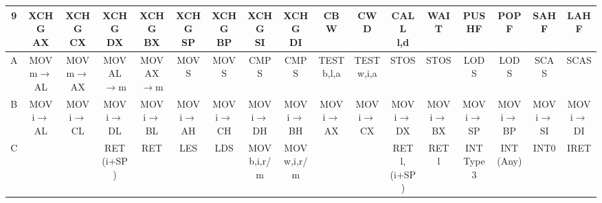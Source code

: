 {\begin{longtable}{|c|c|c|c|c|c|c|c|c|c|c|c|c|c|c|c|c|}
\hline
9 & \makecell{XCHG\\AX} & \makecell{XCHG\\CX} & \makecell{XCHG\\DX} & \makecell{XCHG\\BX} & \makecell{XCHG\\SP} & \makecell{XCHG\\BP} & \makecell{XCHG\\SI} & \makecell{XCHG\\DI} & CBW & CWD & \makecell{CALL\\l,d} & WAIT & PUSHF & POPF & SAHF & LAHF \\
\hline
A & \makecell{MOV\\m$\rightarrow$AL} & \makecell{MOV\\m$\rightarrow$AX} & \makecell{MOV\\AL$\rightarrow$m} & \makecell{MOV\\AX$\rightarrow$m} & MOVS & MOVS & CMPS & CMPS & \makecell{TEST\\b,l,a} & \makecell{TEST\\w,i,a} & STOS & STOS & LODS & LODS & SCAS & SCAS \\
\hline
B & \makecell{MOV\\i$\rightarrow$AL} & \makecell{MOV\\i$\rightarrow$CL} & \makecell{MOV\\i$\rightarrow$DL} & \makecell{MOV\\i$\rightarrow$BL} & \makecell{MOV\\i$\rightarrow$AH} & \makecell{MOV\\i$\rightarrow$CH} & \makecell{MOV\\i$\rightarrow$DH} & \makecell{MOV\\i$\rightarrow$BH} & \makecell{MOV\\i$\rightarrow$AX} & \makecell{MOV\\i$\rightarrow$CX} & \makecell{MOV\\i$\rightarrow$DX} & \makecell{MOV\\i$\rightarrow$BX} & \makecell{MOV\\i$\rightarrow$SP} & \makecell{MOV\\i$\rightarrow$BP} & \makecell{MOV\\i$\rightarrow$SI} & \makecell{MOV\\i$\rightarrow$DI} \\
\hline
C &  &  & \makecell{RET\\(i+SP)} & RET & LES & LDS & \makecell{MOV\\b,i,r/m} & \makecell{MOV\\w,i,r/m} &  &  & \makecell{RET\\l,(i+SP)} & \makecell{RET\\l} & \makecell{INT\\Type 3} & \makecell{INT\\(Any)} & INT0 & IRET \\

\end{longtable}}
